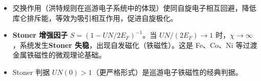 \begin{insightbox}[物理图像]
\begin{itemize}
    \item 交换作用（洪特规则在巡游电子系统中的体现）使同自旋电子相互回避，降低库仑排斥能，等效为吸引相互作用，促进自旋极化。
    \item \textbf{Stoner 增强因子} $S=(1-UN/2E_F)^{-1}$。当 $UN/(2E_F)\to1$ 时，$\chi\to\infty$，系统发生\textbf{Stoner 失稳}，出现自发磁化（铁磁性）。这是 Fe、Co、Ni 等过渡金属铁磁性的微观理论基础。
    \item Stoner 判据 $UN(0)>1$（更严格形式）是巡游电子铁磁性的经典判据。
\end{itemize}
\end{insightbox}
